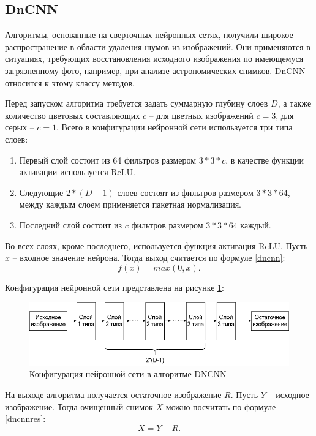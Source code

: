 \subsection{DnCNN}
Алгоритмы, основанные на сверточных нейронных сетях, получили широкое распространение в области удаления шумов из изображений.
Они применяются в ситуациях, требующих восстановления исходного изображения по имеющемуся загрязненному фото, например, при анализе астрономических снимков. 
DnCNN относится к этому классу методов.

Перед запуском алгоритма требуется задать суммарную глубину слоев $D$, а также количество цветовых составляющих $c$ -- для цветных изображений $c=3$, для серых -- $c=1$. Всего в конфигурации нейронной сети используется три типа слоев:
\begin{enumerate}
	\item Первый слой состоит из 64 фильтров размером $3*3*c$, в качестве функции активации используется ReLU.
	\item Следующие $2*(D - 1)$ слоев состоят из фильтров размером $3*3*64$, между каждым слоем применяется пакетная нормализация.
	\item Последний слой состоит из $c$ фильтров размером $3*3*64$ каждый.
\end{enumerate}

Во всех слоях, кроме последнего, используется функция активация ReLU. 
Пусть $x$ -- входное значение нейрона. Тогда выход считается по формуле \ref{dncnn}: 
\begin{equation}
	\label{dncnn}
	f(x) = max(0, x).
\end{equation}

Конфигурация нейронной сети представлена на рисунке \ref{fig::dncnn}:
\FloatBarrier
\begin{figure}[h]	
	\begin{center}
		\includegraphics[width=\linewidth]{inc/png/dnn.png}
	\end{center}
	\captionsetup{justification=centering}
	\caption{Конфигурация нейронной сети в алгоритме DNCNN}
	\label{fig::dncnn}
\end{figure}
\FloatBarrier

На выходе алгоритма получается остаточное изображение $R$. 
Пусть $Y$ -- исходное изображение.
Тогда очищенный снимок $X$ можно посчитать по формуле \ref{dncnnres}:
\begin{equation}
 	\label{dncnnres}
 	X = Y - R.
\end{equation}

